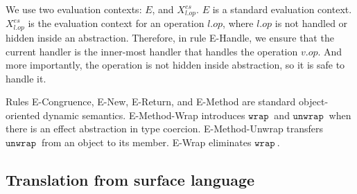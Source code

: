 \documentclass{article}
\theoremstyle{definition}
\newcommand{\keywadj}[1]{\mathtt{#1}}
\newcommand{\keyw}[1]{\keywadj{#1}~}
\begin{document}
We use two evaluation contexts: $E$, and $X^{es}_{l.op}$. $E$ is a standard evaluation context. $X^{es}_{l.op}$ is the evaluation context for an operation $l.op$, where $l.op$ is not handled or hidden inside an abstraction. Therefore, in rule E-Handle, we ensure that the current handler is the inner-most handler that handles the operation $v.op$. And more importantly, the operation is not hidden inside abstraction, so it is safe to handle it.

Rules E-Congruence, E-New, E-Return, and E-Method are standard object-oriented dynamic semantics. E-Method-Wrap introduces $\keyw{wrap}$ and $\keyw{unwrap}$  when there is an effect abstraction in type coercion. E-Method-Unwrap transfers $\keyw{unwrap}$ from an object to its member.  E-Wrap eliminates $\keyw{wrap}$.


\subsection{ Translation from surface language}
\label{sec-translation}
\end{document}
